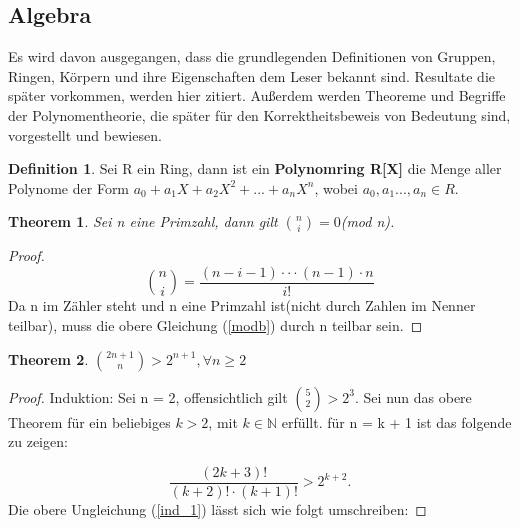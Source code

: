 \documentclass[12pt,oneside]{article}
\newtheorem{theorem}{Theorem}[section]
\theoremstyle{remark}
\theoremstyle{definition}
\newtheorem{definition}{Definition}[section]
\begin{document}
\subsection{Algebra}
Es wird davon ausgegangen, dass die grundlegenden Definitionen von Gruppen, Ringen, Körpern und ihre Eigenschaften dem Leser bekannt sind. Resultate die später vorkommen, werden hier zitiert. Außerdem werden Theoreme und Begriffe der Polynomentheorie, die später für den Korrektheitsbeweis von Bedeutung sind, vorgestellt und bewiesen.
\begin{flushleft}

\smallskip

\begin{definition}
Sei R ein Ring, dann ist ein \textbf{Polynomring R[X]} die Menge aller Polynome der Form $a_{0} + a_{1}X + a_{2} X^2 + ... + a_{n}X^n$, wobei $a_{0},a_{1}...,a_{n} \in R$.
\end{definition}

\smallskip 

\begin{theorem}\label{th_25}
Sei n eine Primzahl, dann gilt ${n \choose i} = 0 $(mod n).
\end{theorem}

\begin{proof}
\begin{equation}\label{modb}
    {n \choose i} = \frac{(n - i - 1) \cdot \cdot \cdot (n - 1) \cdot n }{i!}
\end{equation}
Da n im Zähler steht und n eine Primzahl ist(nicht durch Zahlen im Nenner teilbar), muss die obere Gleichung (\ref{modb}) durch n teilbar sein. 
\end{proof}

\smallskip
\begin{flushleft}
\begin{theorem}
${2n + 1 \choose n} > 2^{n+1}, \forall n \geq 2$
\end{theorem}

\begin{proof}
Induktion: Sei n = 2, offensichtlich gilt ${5 \choose 2} > 2^3$. Sei nun das obere Theorem für ein beliebiges $k > 2 $, mit $ k \in \mathbb{N}$ erfüllt.\newline\newline
für n = k + 1 ist das folgende zu zeigen: 

\begin{equation}\label{ind_1}
    \frac{(2k + 3)!}{(k + 2)!\cdot(k + 1)!} > 2^{k+2}.
\end{equation}
\newline\newline
Die obere Ungleichung (\ref{ind_1}) lässt sich wie folgt umschreiben:\newline\newline



\end{proof}
\end{flushleft}
\end{flushleft}
\end{document}
